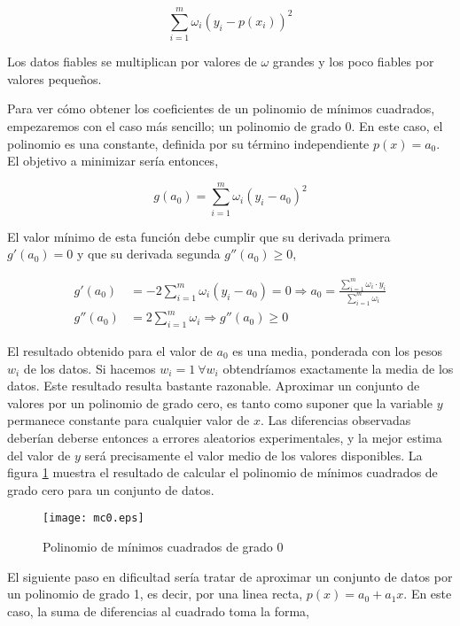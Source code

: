 \begin{equation*}
\sum_{i=1}^m \omega_i \left(y_i-p(x_i)\right)^2
\end{equation*}

Los datos fiables se multiplican por valores de $\omega$ grandes y los poco fiables por valores pequeños.

Para ver cómo obtener los coeficientes de un polinomio de mínimos cuadrados, empezaremos con el caso más sencillo; un polinomio de grado $0$. En este caso, el polinomio es una constante, definida por su término independiente $p(x)=a_0$. El objetivo a minimizar sería entonces,

\begin{equation*}
g(a_0)=\sum_{i=1}^m \omega_i \left(y_i-a_0\right)^2
\end{equation*}

El valor mínimo de esta función debe cumplir que su derivada primera $g'(a_0)=0$ y que su derivada segunda  $g''(a_0)\geq 0$,

\begin{align*}
g'(a_0)&=-2\sum_{i=1}^m \omega_i \left(y_i-a_0\right)=0 \Rightarrow a_0=\frac{\sum_{i=1}^m \omega_i\cdot y_i}{ \sum_{i=1}^m \omega_i}\\
g''(a_0)&=2\sum_{i=1}^m \omega_i \Rightarrow  g''(a_0) \geq 0
\end{align*}

El resultado obtenido para el valor de $a_0$ es una media, ponderada con los pesos $w_i$ de los datos. Si hacemos $w_i=1 \ \forall w_i$ obtendríamos exactamente la media de los datos. Este resultado resulta bastante razonable. Aproximar un conjunto de valores por un polinomio de grado cero, es tanto como suponer que la variable $y$ permanece constante para cualquier valor de $x$. Las diferencias observadas deberían deberse entonces a errores aleatorios experimentales, y la mejor estima del valor de $y$ será precisamente el valor medio de los valores disponibles. La figura \ref{fig:mc0} muestra el resultado de  calcular el polinomio de mínimos cuadrados de grado cero para un conjunto de datos.

\begin{figure}[h]
\centering
\texttt{[image: mc0.eps]}
\caption{Polinomio de mínimos cuadrados de grado 0} 
\label{fig:mc0}
\end{figure} 

El siguiente paso en dificultad sería tratar de aproximar un conjunto de datos por un polinomio de grado 1, es decir, por una linea recta, $p(x)=a_0+a_1 x$. En este caso, la suma de diferencias al cuadrado toma la forma,

